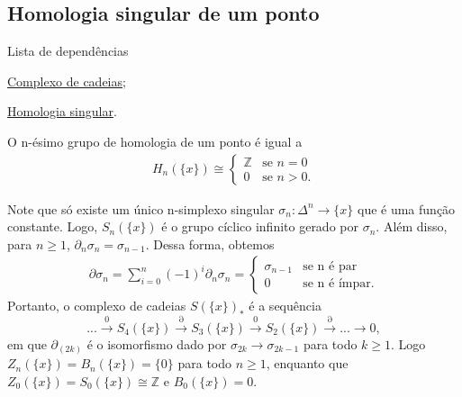 \subsection{Homologia singular de um ponto} %
\label{homologia-singular-de-um-ponto-prop}
\begin{titlemize}{Lista de dependências}
	\item \hyperref[complexo-de-cadeias-def]{Complexo de cadeias};\\ 
    \item \hyperref[homologia-singular-def]{Homologia singular}.
\end{titlemize}

\begin{prop}
    O n-ésimo grupo de homologia de um ponto é igual a
    \begin{align*}
        H_n(\{x\})\cong\begin{cases}
            \mathbb{Z}&\text{se }n=0\\
            0&\text{se }n>0.
        \end{cases}
    \end{align*}
\end{prop}

\begin{dem}
    Note que só existe um único n-simplexo singular $\sigma_n:\Delta^n\rightarrow \{x\}$ que é uma função constante. Logo, $S_n(\{x\})$ é o grupo cíclico infinito gerado por $\sigma_n$. Além disso, para $n\ge 1$, $\partial_n \sigma_n=\sigma_{n-1}$. Dessa forma, obtemos 
    \begin{align*}
        \partial\sigma_n=\sum_{i=0}^n (-1)^i \partial_n\sigma_n=\begin{cases}
            \sigma_{n-1}&\text{se n é par}\\
            0&\text{se n é ímpar}.
        \end{cases}
    \end{align*}
    Portanto, o complexo de cadeias $S(\{x\})_*$ é a sequência 
    \[...\xrightarrow{0} S_{4}(\{x\})\xrightarrow{\partial} S_3(\{x\})\xrightarrow{0} S_2(\{x\})\xrightarrow{\partial}...\rightarrow 0,\]
    em que $\partial_{(2k)}$ é o isomorfismo dado por $\sigma_{2k}\rightarrow \sigma_{2k-1}$ para todo $k\ge 1$. Logo $Z_n(\{x\})=B_n(\{x\})=\{0\}$ para todo $n\ge 1$, enquanto que $Z_0(\{x\})=S_0 (\{x\})\cong \mathbb{Z}$ e $B_0(\{x\})=0$.
\end{dem}


